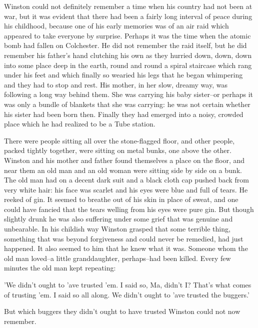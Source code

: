 \documentclass{article}
\begin{document}
Winston could not definitely remember a time when his country had not been
at war, but it was evident that there had been a fairly long interval of
peace during his childhood, because one of his early memories was of an air
raid which appeared to take everyone by surprise. Perhaps it was the time
when the atomic bomb had fallen on Colchester. He did not remember the raid
itself, but he did remember his father's hand clutching his own as they
hurried down, down, down into some place deep in the earth, round and round
a spiral staircase which rang under his feet and which finally so wearied
his legs that he began whimpering and they had to stop and rest. His
mother, in her slow, dreamy way, was following a long way behind them. She
was carrying his baby sister--or perhaps it was only a bundle of blankets
that she was carrying: he was not certain whether his sister had been born
then. Finally they had emerged into a noisy, crowded place which he had
realized to be a Tube station.

There were people sitting all over the stone-flagged floor, and other
people, packed tightly together, were sitting on metal bunks, one above
the other. Winston and his mother and father found themselves a place on
the floor, and near them an old man and an old woman were sitting side by
side on a bunk. The old man had on a decent dark suit and a black cloth cap
pushed back from very white hair: his face was scarlet and his eyes were
blue and full of tears. He reeked of gin. It seemed to breathe out of his
skin in place of sweat, and one could have fancied that the tears welling
from his eyes were pure gin. But though slightly drunk he was also
suffering under some grief that was genuine and unbearable. In his childish
way Winston grasped that some terrible thing, something that was beyond
forgiveness and could never be remedied, had just happened. It also seemed
to him that he knew what it was. Someone whom the old man loved--a little
granddaughter, perhaps--had been killed. Every few minutes the old man kept
repeating:

'We didn't ought to 'ave trusted 'em. I said so, Ma, didn't I? That's what
comes of trusting 'em. I said so all along. We didn't ought to 'ave trusted
the buggers.'

But which buggers they didn't ought to have trusted Winston could not now
remember.
\end{document}
